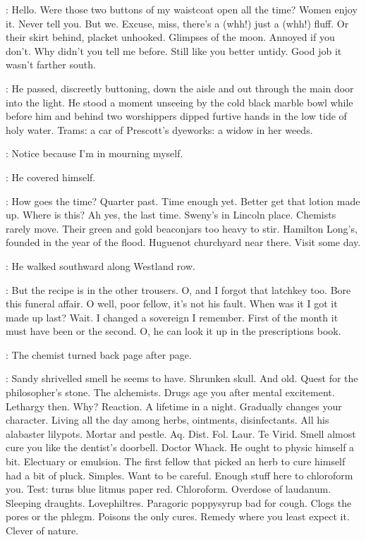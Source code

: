 \BloomInt:
Hello.
Were those two buttons of my waistcoat open all the time?
Women enjoy it.
Never tell you.
But we.
Excuse, miss, there's a (whh!)
just a (whh!) fluff.
Or their skirt behind, placket unhooked.
Glimpses of the moon.
Annoyed if you don't.
Why didn't you tell me before.
Still like you better untidy.
Good job it wasn't farther south.

:
He passed, discreetly buttoning,
down the aisle and out through the main door into the light.
He stood a moment unseeing
by the cold black marble bowl
while before him and behind
two worshippers dipped furtive hands in the low tide of holy water.
Trams:
a car of Prescott's dyeworks:
a widow in her weeds.

\BloomInt:
Notice because I'm in mourning myself.

:
He covered himself.

\BloomInt:
How goes the time?
Quarter past.
Time enough yet.
Better get that lotion made up.
Where is this?
Ah yes, the last time.
Sweny's in Lincoln place.
Chemists rarely move.
Their green and gold beaconjars too heavy to stir.
Hamilton Long's, founded in the year of the flood.
Huguenot churchyard near there.
Visit some day.

:
He walked southward along Westland row.

\BloomInt:
But the recipe is in the other trousers.
O, and I forgot that latchkey too.
Bore
this funeral affair.
O well, poor fellow,
it's not his fault.
When was it I got it made up last?
Wait.
I changed a sovereign I remember.
First of the month it must have been
or the second.
O, he can look it up in the prescriptions book.

:
The chemist turned back page after page.

\BloomInt:
Sandy shrivelled smell he seems to have.
Shrunken skull.
And old.
Quest for the philosopher's stone.
The alchemists.
Drugs age you after mental excitement.
Lethargy then.
Why?
Reaction.
A lifetime in a night.
Gradually changes your character.
Living all the day among herbs, ointments, disinfectants.
All his alabaster lilypots.
Mortar and pestle.
Aq.
Dist.
Fol.
Laur.
Te Virid.
Smell almost cure you like the dentist's doorbell.
Doctor Whack.
He ought to physic himself a bit.
Electuary or emulsion.
The first fellow that picked an herb to cure himself had a bit of pluck.
Simples.
Want to be
careful.
Enough stuff here to chloroform you.
Test: turns blue litmus paper red.
Chloroform.
Overdose of laudanum.
Sleeping draughts.
Lovephiltres.
Paragoric poppysyrup bad for cough.
Clogs the pores or the phlegm.
Poisons the only cures.
Remedy where you least expect it.
Clever of nature.

